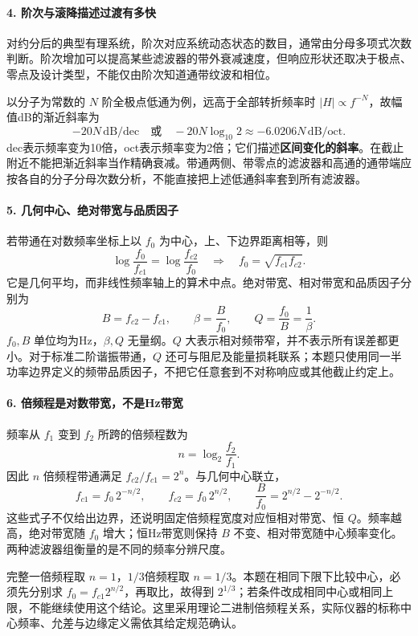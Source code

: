 \paragraph{4. 阶次与滚降描述过渡有多快}
对约分后的典型有理系统，阶次对应系统动态状态的数目，通常由分母多项式次数判断。阶次增加可以提高某些滤波器的带外衰减速度，但响应形状还取决于极点、零点及设计类型，不能仅由阶次知道通带纹波和相位。

以分子为常数的 $N$ 阶全极点低通为例，远高于全部转折频率时 $|H|\propto f^{-N}$，故幅值dB的渐近斜率为
\[
-20N\,\mathrm{dB/dec}
\quad\text{或}\quad
-20N\log_{10}2\approx-6.0206N\,\mathrm{dB/oct}.
\]
dec表示频率变为10倍，oct表示频率变为2倍；它们描述\textbf{区间变化的斜率}。在截止附近不能把渐近斜率当作精确衰减。带通两侧、带零点的滤波器和高通的通带端应按各自的分子分母次数分析，不能直接把上述低通斜率套到所有滤波器。

\paragraph{5. 几何中心、绝对带宽与品质因子}
若带通在对数频率坐标上以 $f_0$ 为中心，上、下边界距离相等，则
\[
\log\frac{f_0}{f_{c1}}=\log\frac{f_{c2}}{f_0}
\quad\Longrightarrow\quad
\boxed{f_0=\sqrt{f_{c1}f_{c2}}}.
\]
它是几何平均，而非线性频率轴上的算术中点。绝对带宽、相对带宽和品质因子分别为
\[
B=f_{c2}-f_{c1},\qquad \beta=\frac{B}{f_0},\qquad
Q=\frac{f_0}{B}=\frac1\beta.
\]
$f_0,B$ 单位均为Hz，$\beta,Q$ 无量纲。$Q$ 大表示相对频带窄，并不表示所有误差都更小。对于标准二阶谐振带通，$Q$ 还可与阻尼及能量损耗联系；本题只使用同一半功率边界定义的频带品质因子，不把它任意套到不对称响应或其他截止约定上。

\paragraph{6. 倍频程是对数带宽，不是Hz带宽}
频率从 $f_1$ 变到 $f_2$ 所跨的倍频程数为
\[
n=\log_2\frac{f_2}{f_1}.
\]
因此 $n$ 倍频程带通满足 $f_{c2}/f_{c1}=2^n$。与几何中心联立，
\[
f_{c1}=f_0\,2^{-n/2},\qquad
f_{c2}=f_0\,2^{n/2},\qquad
\boxed{\frac{B}{f_0}=2^{n/2}-2^{-n/2}}.
\]
这些式子不仅给出边界，还说明固定倍频程宽度对应恒相对带宽、恒 $Q$。频率越高，绝对带宽随 $f_0$ 增大；恒Hz带宽则保持 $B$ 不变、相对带宽随中心频率变化。两种滤波器组衡量的是不同的频率分辨尺度。

完整一倍频程取 $n=1$，$1/3$倍频程取 $n=1/3$。本题在相同下限下比较中心，必须先分别求 $f_0=f_{c1}2^{n/2}$，再取比，故得到 $2^{1/3}$；若条件改成相同中心或相同上限，不能继续使用这个结论。这里采用理论二进制倍频程关系，实际仪器的标称中心频率、允差与边缘定义需依其给定规范确认。

